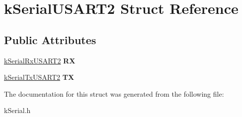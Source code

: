 \hypertarget{structkSerialUSART2}{}\section{k\+Serial\+U\+S\+A\+R\+T2 Struct Reference}
\label{structkSerialUSART2}
\subsection*{Public Attributes}
\begin{DoxyCompactItemize}
\item 
\hyperlink{structkSerialRxUSART2}{k\+Serial\+Rx\+U\+S\+A\+R\+T2} {\bfseries RX}\hypertarget{structkSerialUSART2_a7752417b27b46e8895e5e14a23b3ebb5}{}\label{structkSerialUSART2_a7752417b27b46e8895e5e14a23b3ebb5}

\item 
\hyperlink{structkSerialTxUSART2}{k\+Serial\+Tx\+U\+S\+A\+R\+T2} {\bfseries TX}\hypertarget{structkSerialUSART2_a904c0b4c3b3e51e9c921f3ea733760b0}{}\label{structkSerialUSART2_a904c0b4c3b3e51e9c921f3ea733760b0}

\end{DoxyCompactItemize}


The documentation for this struct was generated from the following file\+:\begin{DoxyCompactItemize}
\item 
k\+Serial.\+h\end{DoxyCompactItemize}
